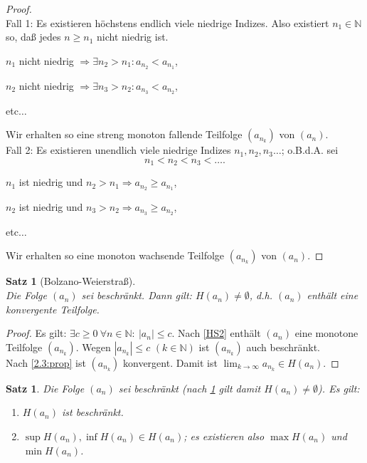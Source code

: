 \documentclass[12pt]{extreport} %
\newcommand{\N}{\mathbb{N}}
\theoremstyle{named}
\theoremstyle{itshape}
\newtheorem{satz}[unnamedtheorem]{Satz}
\theoremstyle{normal}
\begin{document}
\begin{proof} ~\\
	Fall 1: Es existieren höchstens endlich viele niedrige Indizes. Also existiert $n_{1} \in \N$ so, da{\ss} jedes $n \geq n_{1}$ nicht niedrig ist.
	\begin{description}
		\item $n_{1}$ nicht niedrig $\Rightarrow \exists n_{2} > n_{1} : a_{n_{2}} < a_{n_{1}}$,
		\item $n_{2}$ nicht niedrig $\Rightarrow \exists n_{3} > n_{2} : a_{n_{3}} < a_{n_{2}}$,
		\item etc$\dotsc$
	\end{description}
	Wir erhalten so eine streng monoton fallende Teilfolge $(a_{n_{k}})$ von $(a_n)$. \\
	Fall 2: Es existieren unendlich viele niedrige Indizes $n_{1}, n_{2},n_3 \dotsc$; o.B.d.A. sei $$n_{1} < n_{2} < n_3 < \dotsc.$$
	\begin{description}
		\item $n_{1}$ ist niedrig und $n_{2} > n_{1} \Rightarrow a_{n_{2}} \geq a_{n_{1}}$,
		\item $n_{2}$ ist niedrig und $n_{3} > n_{2} \Rightarrow a_{n_{3}} \geq a_{n_{2}}$,
		\item etc$\dotsc$
	\end{description}
	Wir erhalten so eine monoton wachsende Teilfolge $(a_{n_{k}})$ von $(a_n)$.
\end{proof}

\begin{satz}[Bolzano-Weierstra{\ss}] \label{2.12:satz-BolzanoWeierstrass}  ~\\
	Die Folge $(a_{n})$ sei beschränkt. Dann gilt: $H(a_{n}) \neq \emptyset$, d.h. $(a_{n})$ enthält eine konvergente Teilfolge.
\end{satz}

\begin{proof}
	Es gilt: $\exists c \geq 0 ~ \forall n \in \N: ~ |a_{n}| \leq c$. Nach \ref{HS2} enthält $(a_{n})$ eine monotone Teilfolge $(a_{n_{k}})$. 
	Wegen $|a_{n_{k}}| \leq c$ $(k \in \N)$ ist $(a_{n_{k}})$ auch beschränkt. \\
	Nach \ref{2.3:prop} ist $(a_{n_{k}})$ konvergent. Damit ist $\lim_{k \rightarrow \infty} a_{n_{k}} \in H(a_{n})$.
\end{proof}

\begin{satz} \label{2.13:satz}
	Die Folge $(a_{n})$ sei beschränkt (nach \ref{2.12:satz-BolzanoWeierstrass} gilt damit $H(a_{n}) \neq \emptyset$). Es gilt:
	\begin{enumerate}
		\item $H(a_{n})$ ist beschränkt.
		\item $\sup H(a_{n}), \inf H(a_{n}) \in H(a_{n})$; es existieren also $\max H(a_{n})$ und $\min H(a_{n})$.
	\end{enumerate}
\end{satz}
\end{document}
